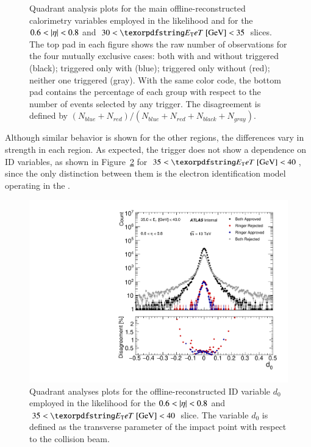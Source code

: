\begin{figure}[h!]
\caption{\label{fig:quadrant_calo_variables_30GeV}
	Quadrant analysis plots for the main offline-reconstructed
	calorimetry variables employed in the
	likelihood and for the $0.6<\abseta{}<0.8$ and
	$30<\et{}~[\text{GeV}]<35$ slices. 
	The top pad in each figure shows the raw number of observations for the four mutually exclusive cases: both with and without \rnn{}
	triggered (black); triggered only with \rnn{} (blue); triggered only without \rnn{} (red); neither one triggered (gray). With the same color code, the bottom pad contains the percentage of each group with respect to the number of events selected by any trigger. The disagreement is defined by $(N_{blue}+N_{red})/(N_{blue}+N_{red}+N_{black}+N_{gray})$.
}
\end{figure}

Although similar behavior is shown for the other 
regions, the differences vary in strength in each \abseta{} region. As expected, 
the trigger does not show a dependence on ID variables, as shown in Figure~\ref{fig:quadrant_track_variables_30GeV} for $35<\et{}~[\text{GeV}]<40$, since the only distinction between them is the electron identification model operating in the \fastcalo{}.


\begin{figure}[h!tb]
\centering
\includegraphics[width=.5\textwidth]{sections/05_analysis/figures/quadrant_plots/HLT_e28_lhtight_nod0_noringer_ivarloose_HLT_e28_lhtight_nod0_ivarloose_trackd0pvunbiased_et4_eta1.pdf}

\caption{\label{fig:quadrant_track_variables_30GeV}
Quadrant analyses plots for the offline-reconstructed ID variable $d_0$ employed in the
likelihood for the $0.6<\abseta{}<0.8$ and $35<\et{}~[\text{GeV}]<40$ slice. The variable $d_0$ is defined as the transverse parameter of the impact point with respect to the collision beam.
}
\end{figure}






